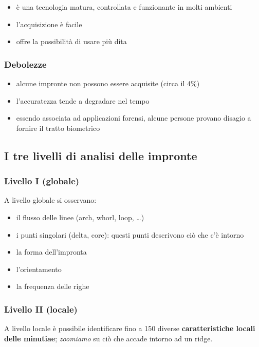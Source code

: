 \begin{itemize}
    \item è una tecnologia matura, controllata e funzionante in molti ambienti
    \item l'acquisizione è facile
    \item offre la possibilità di usare più  dita
\end{itemize}

\subsubsection{Debolezze}

\begin{itemize}
    \item alcune impronte non possono essere acquisite (circa il 4\%)
    \item l'accuratezza tende a degradare nel tempo
    \item essendo associata ad applicazioni forensi, alcune persone provano disagio a fornire il tratto biometrico
\end{itemize}

\newpage
\subsection{I tre livelli di analisi delle impronte}

\subsubsection{Livello I (globale)}
A livello globale si osservano:
\begin{itemize}
    \item il flusso delle linee (arch, whorl, loop, \dots)
    \item i punti singolari (delta, core): questi punti descrivono ciò che c'è intorno
    \item la forma dell'impronta
    \item l'orientamento
    \item la frequenza delle righe 
\end{itemize}

\subsubsection{Livello II (locale)}

A livello locale è possibile identificare fino a 150 diverse \textbf{caratteristiche locali
delle minutiae}; \textit{zoomiamo} su ciò che accade intorno ad un ridge.

